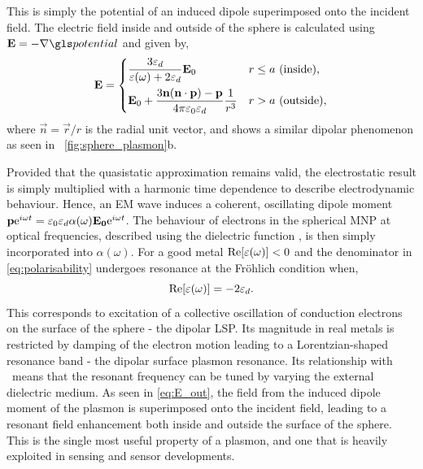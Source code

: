 \documentclass{article}
\begin{document}
This is simply the potential of an induced dipole superimposed onto the incident field. The electric field inside and outside of the sphere is calculated using $\vec{E}=-\nabla\pot$ and given by,
\begin{equation}
	\mathbf{E} =
	\begin{dcases}
	\frac{3\varepsilon_d}{\varepsilon(\omega)+2\varepsilon_d} \mathbf{E}_0 & r \leq a\text{ (inside)}, \\
	\mathbf{E}_0 + \frac{3\mathbf{n}(\mathbf{n}\cdot\mathbf{p}) - \mathbf{p}}{4\pi\varepsilon_0\varepsilon_d}\frac{1}{r^3} & r > a\text{ (outside)},
	\end{dcases}
	\label{eq:E_out}
\end{equation}
where $\vec{n}=\vec{r}/r$ is the radial unit vector, and shows a similar dipolar phenomenon as seen in \figurename~\ref{fig:sphere_plasmon}b.

Provided that the quasistatic approximation remains valid, the electrostatic result is simply multiplied with a harmonic time dependence to describe electrodynamic behaviour. Hence, an EM wave induces a coherent, oscillating dipole moment $\mathbf{p}\mathrm{e}^{i\omega t}=\varepsilon_0\varepsilon_d\alpha(\omega)\mathbf{E_0}\mathrm{e}^{i\omega t}$. The behaviour of electrons in the spherical MNP at optical frequencies, described using the dielectric function \dielectric, is then simply incorporated into $\alpha(\omega)$. For a good metal $\mathrm{Re}\!\left[{\varepsilon(\omega)}\right]<0$ and the denominator in \eqref{eq:polarisability} undergoes resonance
at the Fr\"{o}hlich condition when,
\begin{equation}
	\mathrm{Re}\!\left[{\varepsilon(\omega)}\right] = -2\varepsilon_d. \label{eq:frohlich}
\end{equation}
This corresponds to excitation of a collective oscillation of conduction electrons on the surface of the sphere - the dipolar LSP. Its magnitude in real metals is restricted by damping of the electron motion leading to a Lorentzian-shaped resonance band - the dipolar surface plasmon resonance. Its relationship with \epsdi\ means that the resonant frequency can be tuned by varying the external dielectric medium. As seen in \eqref{eq:E_out}, the field from the induced dipole moment of the plasmon is superimposed onto the incident field, leading to a resonant field enhancement both inside and outside the surface of the sphere. This is the single most useful property of a plasmon, and one that is heavily exploited in sensing and sensor developments.
\end{document}
